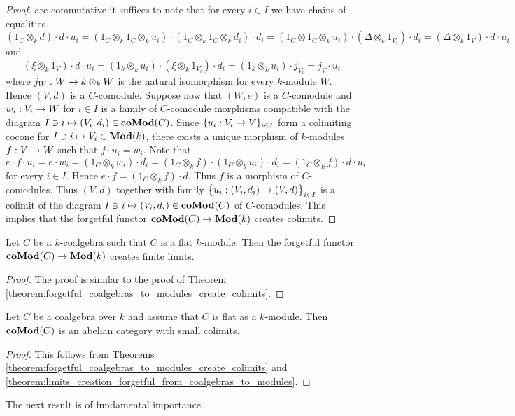 \begin{proof}
are commutative it suffices to note that for every $i\in I$ we have chains of equalities
$$\left(1_C\otimes_{k}d\right)\cdot d\cdot u_i=\left(1_C\otimes_k 1_C\otimes_{k}u_i\right)\cdot \left(1_C\otimes_k 1_C \otimes_{k}d_i\right)\cdot d_i=\left(1_C\otimes 1_C \otimes_{k}u_i\right) \cdot \left(\Delta\otimes_{k}1_{V_i}\right)\cdot d_i=\left(\Delta \otimes_{k}1_V\right)\cdot d\cdot u_i$$
and
$$\left(\xi \otimes_{k}1_V\right)\cdot d\cdot u_i=\left(1_{k}\otimes_{k}u_i\right)\cdot \left(\xi \otimes_{k}1_{V_i}\right)\cdot d_i=\left(1_{k}\otimes_{k}u_i\right)\cdot j_{V_i}=j_V\cdot u_i$$
where $j_W:W\rightarrow k\otimes_{k}W$ is the natural isomorphism for every $k$-module $W$. Hence $(V,d)$ is a $C$-comodule. Suppose now that $(W,e)$ is a $C$-comodule and $w_i:V_i\rightarrow W$ for $i\in I$ is a family of $C$-comodule morphisms compatible with the diagram $I\ni i\mapsto (V_i,d_i)\in \mathbf{coMod}(C)$. Since $\{u_i:V_i\rightarrow V\}_{i\in I}$ form a colimiting cocone for $I\ni i\mapsto V_i\in \mathbf{Mod}(k)$, there exists a unique morphism of $k$-modules $f:V\rightarrow W$ such that $f\cdot u_i=w_i$. Note that
$$e\cdot f \cdot u_i= e\cdot w_i=\left(1_C\otimes_{k}w_i\right)\cdot d_i=\left(1_C\otimes_{k}f\right)\cdot \left(1_C\otimes_{k}u_i\right)\cdot d_i=\left(1_C\otimes_{k}f\right)\cdot d\cdot u_i$$
for every $i\in I$. Hence $e\cdot f=\left(1_C\otimes_{k}f\right)\cdot d$. Thus $f$ is a morphism of $C$-comodules. Thus $(V,d)$ together with family $\big\{u_i:(V_i,d_i)\rightarrow (V,d)\big\}_{i\in I}$ is a colimit of the diagram $I\ni i\mapsto (V_i,d_i)\in \mathbf{coMod}(C)$ of $C$-comodules. This implies that the forgetful functor $\mathbf{coMod}(C)\rightarrow \mathbf{Mod}(k)$ creates colimits.
\end{proof}

\begin{theorem}\label{theorem:limits_creation_forgetful_from_coalgebras_to_modules}
Let $C$ be a $k$-coalgebra such that $C$ is a flat $k$-module. Then the forgetful functor $\mathbf{coMod}(C)\rightarrow \mathbf{Mod}(k)$ creates finite limits.
\end{theorem}
\begin{proof}
The proof is similar to the proof of Theorem \ref{theorem:forgetful_coalgebras_to_modules_create_colimits}.
\end{proof}

\begin{corollary}\label{corollary:comodules_category_properties}
Let $C$ be a coalgebra over $k$ and assume that $C$ is flat as a $k$-module. Then $\mathbf{coMod}(C)$ is an abelian category with small colimits.
\end{corollary}
\begin{proof}
This follows from Theorems \ref{theorem:forgetful_coalgebras_to_modules_create_colimits} and \ref{theorem:limits_creation_forgetful_from_coalgebras_to_modules}.
\end{proof}
\noindent
The next result is of fundamental importance.

